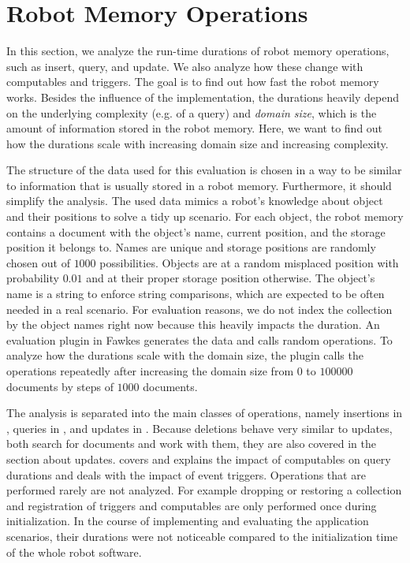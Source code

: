\section{Robot Memory Operations}
\label{sec:op-durations}
In this section, we analyze the run-time durations of robot memory
operations, such as insert, query, and update. We also analyze how
these change with computables and triggers. The goal is to find out
how fast the robot memory works. Besides the influence of the
implementation, the durations heavily depend on the underlying
complexity (e.g. of a query) and \emph{domain size}, which is the
amount of information stored in the robot memory. Here, we want to
find out how the durations scale with increasing domain size and
increasing complexity.

The structure of the data used for this evaluation is chosen in a way
to be similar to information that is usually stored in a robot
memory. Furthermore, it should simplify the analysis. The used data mimics
a robot's knowledge about object and their positions to solve a tidy
up scenario. For each object, the robot memory contains a document
with the object's name, current position, and the storage position it
belongs to. Names are unique and storage positions are randomly chosen
out of $1000$ possibilities. Objects are at a random misplaced position with
probability $0.01$ and at their proper storage position otherwise. The
object's name is a string to enforce string comparisons, which are
expected to be often needed in a real scenario. For evaluation
reasons, we do not index the collection by the object names right now
because this heavily impacts the duration. An evaluation plugin in
Fawkes generates the data and calls random operations. To analyze how
the durations scale with the domain size, the plugin calls the
operations repeatedly after increasing the domain size from $0$ to
$100000$ documents by steps of $1000$ documents.

The analysis is separated into the main classes of operations, namely
insertions in , queries in
, and updates in . Because
deletions behave very similar to updates, both search for documents
and work with them, they are also covered in the section about
updates.  covers and explains the impact
of computables on query durations and  deals
with the impact of event triggers. Operations that are performed
rarely are not analyzed. For example dropping or restoring a collection and
registration of triggers and computables are only performed once
during initialization.  In the course of implementing and evaluating
the application scenarios, their durations were not noticeable compared
to the initialization time of the whole robot software.

